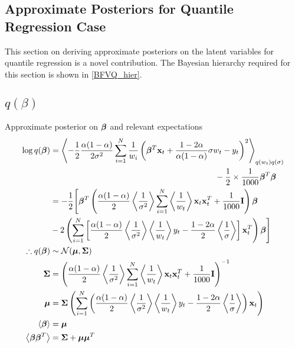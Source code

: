 \clearpage
\begin{appendices}


\section{Approximate Posteriors for Quantile Regression Case}
This section on deriving approximate posteriors on the latent variables for quantile regression is a novel contribution. The Bayesian hierarchy required for this section is shown in \eqref{BFVQ_hier}.

\subsection{ $q(\beta)$}
\label{sec:q_beta}
Approximate posterior on $\bm{\beta}$ and relevant expectations
\begin{align}
\nonumber
\log q(\bm{\beta})&=\left\langle-\frac{1}{2}\frac{\alpha(1-\alpha)}{2\sigma^2}\sum_{i=1}^{N}\frac{1}{w_i}\left(\bm{\beta}^T \mathbf{x}_t+\frac{1-2\alpha}{\alpha(1-\alpha)}\sigma w_t-y_t\right)^2\right\rangle_{q(w_t)q(\sigma)}\\
\nonumber
&\qquad\qquad\qquad\qquad\qquad\qquad\qquad\qquad\qquad\qquad-\frac{1}{2}\times\frac{1}{1000}\bm{\beta}^T\bm{\beta}\\
\nonumber
&=-\frac{1}{2}\Biggl[\bm{\beta}^T\left(\frac{\alpha(1-\alpha)}{2}\left\langle\frac{1}{\sigma^2}\right\rangle\sum_{i=1}^{N}\left\langle\frac{1}{w_t}\right\rangle\mathbf{x}_t\mathbf{x}_t^T+\frac{1}{1000}\mathbf{I}\right)\bm{\beta}\\
\nonumber
&-2\left(\sum_{i=1}^{N}\left[\frac{\alpha(1-\alpha)}{2}\left\langle\frac{1}{\sigma^2}\right\rangle\left\langle\frac{1}{w_t}\right\rangle y_t-\frac{1-2\alpha}{2}\left\langle\frac{1}{\sigma}\right\rangle\right]\mathbf{x}_t^T\right)\bm{\beta}\Biggr]\\
\therefore q(\bm{\beta})&\sim{\mathcal{N}}({\boldsymbol{\mu}},{\mathbf{\Sigma}})\\
{\mathbf{\Sigma}} &=\left(\frac{\alpha(1-\alpha)}{2}\left\langle\frac{1}{\sigma^2}\right\rangle\sum_{i=1}^{N}\left\langle\frac{1}{w_t}\right\rangle\mathbf{x}_t\mathbf{x}_t^T+\frac{1}{1000}\mathbf{I}\right)^{-1}\\
{\boldsymbol{\mu}}&={\mathbf{\Sigma}}\left(\sum_{i=1}^{N}\left(\frac{\alpha(1-\alpha)}{2}\left\langle\frac{1}{\sigma^2}\right\rangle\left\langle\frac{1}{w_t}\right\rangle y_t-\frac{1-2\alpha}{2}\left\langle\frac{1}{\sigma}\right\rangle\right)\mathbf{x}_t\right)\\
\left\langle\bm{\beta}\right\rangle&={\boldsymbol{\mu}}\\
\left\langle\bm{\beta}\bm{\beta}^T\right\rangle&={\mathbf{\Sigma}}+{\boldsymbol{\mu}}{\boldsymbol{\mu}}^T
\end{align}


\end{appendices}
